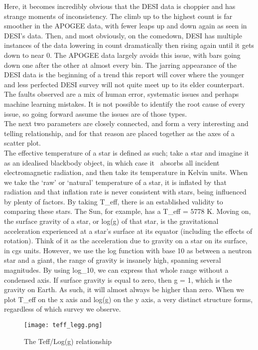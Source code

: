 \documentclass{article}
\begin{document}
\indent Here, it becomes incredibly obvious that the DESI data is choppier and has strange moments of inconsistency. The climb up to the highest count is far smoother in the APOGEE data, with fewer leaps up and down again as seen in DESI’s data. Then, and most obviously, on the comedown, DESI has multiple instances of the data lowering in count dramatically then rising again until it gets down to near 0. The APOGEE data largely avoids this issue, with bars going down one after the other at almost every bin. The jarring appearance of the DESI data is the beginning of a trend this report will cover where the younger and less perfected DESI survey will not quite meet up to its elder counterpart. The faults observed are a mix of human error, systematic issues and perhaps machine learning mistakes. It is not possible to identify the root cause of every issue, so going forward assume the issues are of those types.\\
\indent The next two parameters are closely connected, and form a very interesting and telling relationship, and for that reason are placed together as the axes of a scatter plot. \\
\indent The effective temperature of a star is defined as such; take a star and imagine it as an idealised blackbody object, in which case it  absorbs all incident electromagnetic radiation, and then take its temperature in Kelvin units. When we take the ‘raw’ or ‘natural’ temperature of a star, it is inflated by that radiation and that inflation rate is never consistent with stars, being influenced by plenty of factors. By taking T\_eff, there is an established validity to comparing these stars. The Sun, for example, has a T\_eff = 5778 K. Moving on, the surface gravity of a star, or log(g) of that star, is the gravitational acceleration experienced at a star's surface at its equator (including the effects of rotation). Think of it as the acceleration due to gravity on a star on its surface, in cgs units. However, we use the log function with base 10 as between a neutron star and a giant, the range of gravity is insanely high, spanning several magnitudes. By using log\_10, we can express that whole range without a condensed axis. If surface gravity is equal to zero, then g = 1, which is the gravity on Earth. As such, it will almost always be higher than zero. When we plot T\_eff on the x axis and log(g) on the y axis, a very distinct structure forms, regardless of which survey we observe.\\

\begin{figure}[h!tbp]
    \centering
    \texttt{[image: teff\_legg.png]}
    \caption{The Teff/Log(g) relationship}
    \label{fig:3}
\end{figure}
\end{document}
